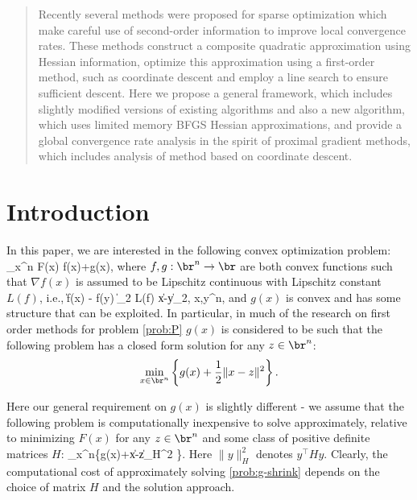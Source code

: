 \documentclass[11pt]{article}
\numberwithin{equation}{section}
\begin{document}
\begin{abstract}
Recently several methods were proposed for sparse optimization which make careful use of second-order information \cite{Hsieh2011,nGLMNET,Olsen2012,Chin2012} to improve local convergence  rates. These methods construct a composite quadratic  approximation using Hessian information, optimize this approximation using a first-order method, such as coordinate descent and employ a line search to  ensure sufficient descent.
Here we propose a general framework, which includes slightly modified versions of existing algorithms and also a new algorithm, which uses limited memory BFGS Hessian approximations,   and provide a global convergence rate analysis in the spirit of proximal gradient methods, which includes analysis of method based on coordinate descent. 

\end{abstract}



\section{Introduction} %
\label{sec:introduction}
In this paper, we are interested in the following convex optimization problem: \bea\label{prob:P} \min_{x\in\br^n} F(x)\equiv
f(x)+g(x), \eea where $f,g:\br^n\rightarrow\br$ are both convex
functions such that  $\nabla f(x)$ is assumed to be Lipschitz continuous with Lipschitz constant $L(f)$, i.e., \beaa \|\nabla f(x) - \nabla f(y) \|_2 \leq L(f) \|x-y\|_2, \quad \forall x,y\in\br^n,\eeaa
and $g(x)$ is convex and has some structure that can be exploited. In particular,  in much of the research on first order methods for problem \eqref{prob:P}  $g(x)$ is considered to be such that   the following problem has a closed form solution
 for any $z\in\br^n$:
 \[\min_{x\in\br^n}\left\{g(x)+\frac{1}{2}\|x-z\|^2 \right\}.
 \]
 
 Here our general requirement on $g(x)$ is slightly different - we assume that the following problem is
 computationally inexpensive to solve approximately, relative to minimizing $F(x)$
 for any $z\in\br^n$ and some class of positive definite matrices $H$:
 \bea\label{prob:g-shrink}\min_{x\in\br^n}\left\{g(x)+\|x-z\|_H^2 \right\}.\eea
 Here $\|y\|^2_H$ denotes $y^\top H y$.   Clearly, the computational cost of approximately solving \eqref{prob:g-shrink} depends on the choice of matrix $H$ and the solution approach. 
 
\end{document}
